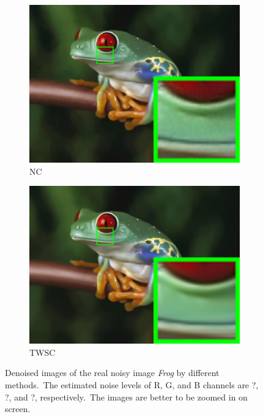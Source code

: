 \begin{figure}
\begin{subfigure}[t]{0.24\textwidth}
        \includegraphics[width=1\textwidth]{images/twsc/nc/resize_br_NC_frog.png}
		\caption{NC}
    \end{subfigure}
    \hfill
    \begin{subfigure}[t]{0.24\textwidth}
        \centering
        \includegraphics[width=1\textwidth]{images/twsc/nc/resize_br_TWSC_frog.png}
		\caption{TWSC}
    \end{subfigure}
    \caption{Denoised images of the real noisy image \textsl{Frog} \cite{ncwebsite} by different methods.\ The estimated noise levels of R, G, and B channels are ?, ?, and ?, respectively.\ The images are better to be zoomed in on screen.}
    \label{fig5-9}
\end{figure}


